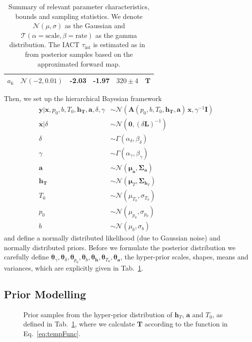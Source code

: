 \begin{table}
\begin{tabular}{ |c||c|c|c|c|c|   }
		$a_{6}$ & $\mathcal{N}(-2,0.01)$ &-2.03 &-1.97&$320 \pm 4$&$\bm{T}$\\
		\hline
	\end{tabular}
	\caption[Summary of relevant parameter characteristics, bounds and sampling statistics.]{Summary of relevant parameter characteristics, bounds and sampling statistics. We denote $\mathcal{N}(\mu,\sigma)$ as the Gaussian and $\mathcal{T}(\alpha = \text{scale}, \beta = \text{rate})$ as the gamma distribution. The IACT $\tau_{\text{int}}$ is estimated as in~\cite{UwerrM} from posterior samples based on the approximated forward map.}
	\label{tab:priors}
\end{table}

Then, we set up the hierarchical Bayesian framework
\begin{subequations}
	\begin{align}
		\bm{y} |  \bm{x},p_0,b,T_0,\bm{h_T},\bm{a} ,\delta,\gamma  &\sim \mathcal{N}(\bm{A}(p_0,b,T_0,\bm{h_T},\bm{a}) \, \bm{x}, \gamma^{-1} \bm{I}) \label{eq:likelihoodFull} \\
		\bm{x}| \delta  &\sim \mathcal{N}(\bm{0}, (\delta \bm{L})^{-1} ) \label{eq:priorXFull} \\
		\delta  &\sim \Gamma(\alpha_{\delta} , \beta_{\delta} )\label{eq:priorDelFull} \\
		\gamma  &\sim \Gamma(\alpha_{\gamma}, \beta_{\gamma})\label{eq:priorGamFull} \\
		\bm{a}  &\sim \mathcal{N}(\bm{\mu}_{\bm{a}}, \bm{\Sigma}_{\bm{a}})\\
		\bm{h}_{\bm{T}}  &\sim \mathcal{N}(\bm{\mu}_{T}, \bm{\Sigma}_{\bm{h}_T}) \\
		T_0  &\sim \mathcal{N}(\mu_{T_0}, \sigma_{T_0} )\\
		p_0  &\sim \mathcal{N}(\mu_{p_0}, \sigma_{p_0} )\\
		b  &\sim \mathcal{N}(\mu_b, \sigma_b )
	\end{align}
	\label{eq:BayMode}
\end{subequations}
and define a normally distributed likelihood (due to Gaussian noise) and normally distributed priors.
Before we formulate the posterior distribution we carefully define $\bm{\theta}_{\gamma}, \bm{\theta}_{\delta},\bm{\theta}_{p_0},\bm{\theta}_{b},\bm{\theta}_{\bm{h}},\bm{\theta}_{T_0},\bm{\theta}_{\bm{a}}$, the hyper-prior scales, shapes, means and variances, which are explicitly given in Tab.~\ref{tab:priors}.

\subsection{Prior Modelling}
\begin{figure}[ht!]
	\centering
	
	\caption[Prior Samples of $\bm{T}$ according to the respective hyper-prior distribution.]{Prior samples from the hyper-prior distribution of $\bm{h}_T$, $\bm{a}$ and $T_0$, as defined in Tab.~\ref{tab:priors}, where we calculate $\bm{T}$ according to the function in Eq.~\ref{eq:tempFunc}.}
	\label{fig:PriorTemp}
\end{figure}

